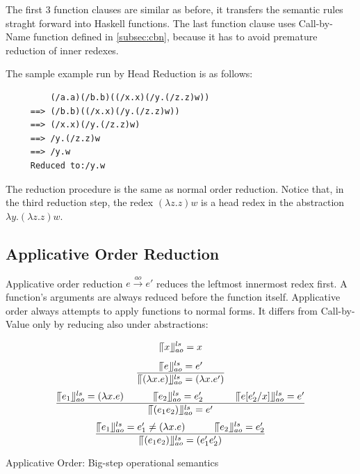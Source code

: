 The first 3 function clauses are similar as before, it transfers the semantic rules straght forward into Haskell functions. The last function clause uses Call-by-Name function defined in \ref{subsec:cbn}, because it has to avoid premature reduction of inner redexes. 

\begin{exmp}
\normalfont The sample example run by Head Reduction is as follows:
\end{exmp}

\begin{verbatim}
         (/a.a)(/b.b)((/x.x)(/y.(/z.z)w))
     ==> (/b.b)((/x.x)(/y.(/z.z)w))
     ==> (/x.x)(/y.(/z.z)w)
     ==> /y.(/z.z)w
     ==> /y.w
     Reduced to:/y.w
\end{verbatim}

The reduction procedure is the same as normal order reduction. Notice that, in the third reduction step, the redex $(\lambda z.z)w$ is a head redex in the abstraction $\lambda y.(\lambda z.z)w$. 

\subsection{Applicative Order Reduction}

Applicative order reduction $e\xrightarrow{ao} e'$ reduces the leftmost innermost redex first. A function's arguments are always reduced before the function itself. Applicative order always attempts to apply functions to normal forms. It differs from Call-by-Value only by reducing also under abstractions:


\begin{equation*}
\llceil x \rrfloor ^{ls} _{ao} = x
\end{equation*}
\begin{equation*}
\frac{\llceil e \rrfloor ^{ls} _{ao} = e'}{\llceil (\lambda x.e) \rrfloor ^{ls} _{ao} = (\lambda x.e')}
\end{equation*}
\begin{equation*}
\frac{\llceil e_1 \rrfloor ^{ls} _{ao} = (\lambda x.e)\ \ \ \ \ \ \ \ \ \llceil e_2 \rrfloor ^{ls} _{ao} = e'_2\ \ \ \ \ \ \ \ \ \ \llceil e[e'_2/x] \rrfloor ^{ls} _{ao} = e'}{\llceil (e_1e_2) \rrfloor ^{ls} _{ao} = e'}
\end{equation*}
\begin{equation*}
\frac{\llceil e_1 \rrfloor ^{ls} _{ao} = e'_1\neq (\lambda x.e)\ \ \ \ \ \ \ \ \ \llceil e_2 \rrfloor ^{ls} _{ao} = e'_2}{\llceil (e_1e_2) \rrfloor ^{ls} _{ao} = (e'_1e'_2)}
\end{equation*}
\begin{center}
Applicative Order: Big-step operational semantics
\end{center}

